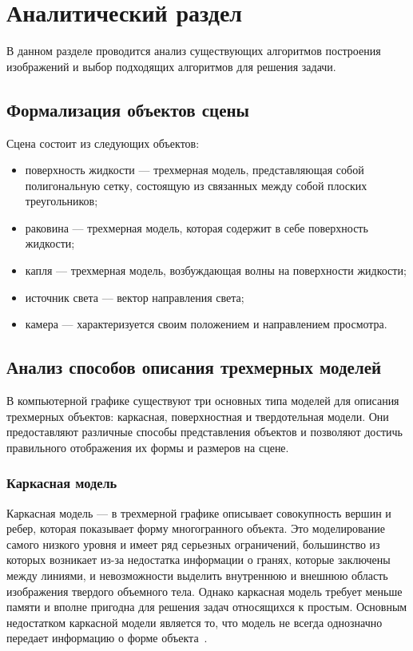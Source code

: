 \chapter{Аналитический раздел}

В данном разделе проводится анализ существующих алгоритмов построения изображений и выбор подходящих алгоритмов для решения задачи.

\section{Формализация объектов сцены}

Сцена состоит из следующих объектов:
\begin{itemize}[label*=---]
    \item поверхность жидкости --- трехмерная модель, представляющая собой полигональную сетку, состоящую из связанных между собой плоских треугольников;
    \item раковина --- трехмерная модель, которая содержит в себе поверхность жидкости;
    \item капля --- трехмерная модель, возбуждающая волны на поверхности жидкости;
    \item источник света --- вектор направления света;
    \item камера --- характеризуется своим положением и направлением просмотра.
\end{itemize}

\section{Анализ способов описания трехмерных моделей}

В компьютерной графике существуют три основных типа моделей для описания трехмерных объектов: каркасная, поверхностная и твердотельная модели. 
Они предоставляют различные способы представления объектов и позволяют 
достичь правильного отображения их формы и размеров на сцене.

\subsection{Каркасная модель}
Каркасная модель –-- в трехмерной графике описывает совокупность вершин и ребер, которая показывает форму многогранного объекта. 
Это моделирование самого низкого уровня и имеет ряд серьезных ограничений, большинство из которых возникает из-за недостатка информации о гранях, которые заключены между линиями, и невозможности выделить внутреннюю и внешнюю область изображения твердого объемного тела. 
Однако каркасная модель требует меньше памяти и вполне пригодна для решения задач относящихся к простым. 
Основным недостатком каркасной модели является то, что модель не всегда однозначно передает информацию о форме объекта~\cite{MTM}.

